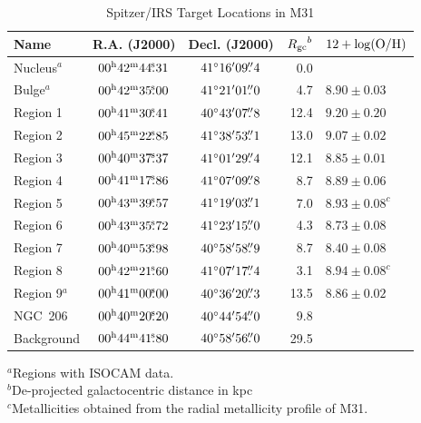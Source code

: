 \begin{table}
 \centering
 \begin{minipage}{90mm}
\caption{Spitzer/IRS Target Locations in M31
\label{regions}}
\begin{tabular}{lccrl}
\hline Name & R.A. (J2000) & Decl. (J2000) & ${R_{\rm gc}}^b$ & $12+\log({\rm O/H})$
\\
 \hline
Nucleus$^a$ & $00^{\rmn{h}}42^{\rmn{m}}44\fs31$ & $41\hbox{$^\circ$}16\hbox{$^\prime$}09\hbox{$.\!\!^{\prime\prime}$}4$  & 0.0 & \\
Bulge$^a$   & $00^{\rmn{h}}42^{\rmn{m}}35\fs00$ & $41\hbox{$^\circ$}21\hbox{$^\prime$}01\hbox{$.\!\!^{\prime\prime}$}0$  & 4.7 &$8.90\pm0.03$\\
Region 1    & $00^{\rmn{h}}41^{\rmn{m}}30\fs41$ & $40\hbox{$^\circ$}43\hbox{$^\prime$}07\hbox{$.\!\!^{\prime\prime}$}8$  & 12.4 &$9.20\pm0.20$\\
Region 2    & $00^{\rmn{h}}45^{\rmn{m}}22\fs85$ & $41\hbox{$^\circ$}38\hbox{$^\prime$}53\hbox{$.\!\!^{\prime\prime}$}1$  & 13.0 &$9.07\pm0.02$\\
Region 3    & $00^{\rmn{h}}40^{\rmn{m}}37\fs37$ & $41\hbox{$^\circ$}01\hbox{$^\prime$}29\hbox{$.\!\!^{\prime\prime}$}4$  & 12.1 &$8.85\pm0.01$\\
Region 4    & $00^{\rmn{h}}41^{\rmn{m}}17\fs86$ & $41\hbox{$^\circ$}07\hbox{$^\prime$}09\hbox{$.\!\!^{\prime\prime}$}8$  & 8.7 &$8.89\pm0.06$\\
Region 5    & $00^{\rmn{h}}43^{\rmn{m}}39\fs57$ & $41\hbox{$^\circ$}19\hbox{$^\prime$}03\hbox{$.\!\!^{\prime\prime}$}1$  & 7.0 &$8.93\pm0.08^c$\\
Region 6    & $00^{\rmn{h}}43^{\rmn{m}}35\fs72$ & $41\hbox{$^\circ$}23\hbox{$^\prime$}15\hbox{$.\!\!^{\prime\prime}$}0$  & 4.3 &$8.73\pm0.08$\\
Region 7    & $00^{\rmn{h}}40^{\rmn{m}}53\fs98$ & $40\hbox{$^\circ$}58\hbox{$^\prime$}58\hbox{$.\!\!^{\prime\prime}$}9$  & 8.7 &$8.40\pm0.08$\\
Region 8    & $00^{\rmn{h}}42^{\rmn{m}}21\fs60$ & $41\hbox{$^\circ$}07\hbox{$^\prime$}17\hbox{$.\!\!^{\prime\prime}$}4$  & 3.1 &$8.94\pm0.08^c$\\
Region 9$^a$& $00^{\rmn{h}}41^{\rmn{m}}00\fs00$ & $40\hbox{$^\circ$}36\hbox{$^\prime$}20\hbox{$.\!\!^{\prime\prime}$}3$  & 13.5 &$8.86\pm0.02$\\
NGC~206     & $00^{\rmn{h}}40^{\rmn{m}}20\fs20$ & $40\hbox{$^\circ$}44\hbox{$^\prime$}54\hbox{$.\!\!^{\prime\prime}$}0$  & 9.8 & \\
Background  & $00^{\rmn{h}}44^{\rmn{m}}41\fs80 $ & $40\hbox{$^\circ$}58\hbox{$^\prime$}56\hbox{$.\!\!^{\prime\prime}$}0$  & 29.5 & \\
\hline
\end{tabular}
{$^a$Regions with ISOCAM data.\\
$^b$De-projected galactocentric distance in kpc\\ 
$^c$Metallicities obtained from the radial metallicity profile of M31.
}
\end{minipage}
\end{table}

